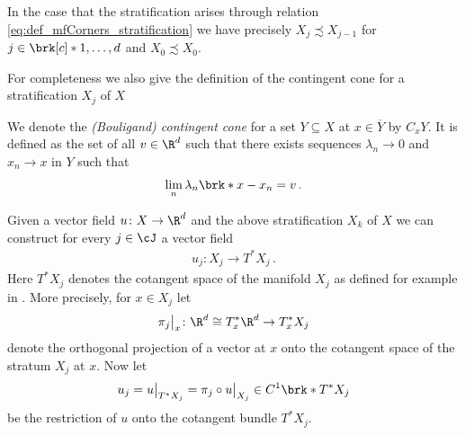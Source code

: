 In the case that the stratification arises through relation \eqref{eq:def_mfCorners_stratification}
we have precisely $X_{j}\precsim X_{j-1}$ for $j\in\brk[c]*{1,\dots,d}$ and $X_0\precsim X_0$.

For completeness we also give the definition of the contingent cone for a 
stratification $X_j$ of $X$
\begin{definition}
  We denote the \emph{(Bouligand) contingent cone} for a set $Y\subseteq X$ at $x\in\overline{Y}$ by $C_xY$.
  It is defined as the set of all $v\in\R^d$ such that there exists sequences $\lambda_n\to0$ and $x_n\to x$ in
  $Y$ such that
  $$\lim_n\lambda_n\brk*{x-x_n}=v\,.$$
\end{definition}

Given a vector field $u\colon X\to\R^d$ and the above stratification $X_k$ of $X$ we can construct for every
$j\in\cJ$ a vector field
\begin{align*}
  u_j\colon X_j\to T^*X_j\,.
\end{align*}
Here $T^*X_j$ denotes the cotangent space of the manifold $X_j$ as defined for example in \cite[Chapter 6]{Hirsch1994}.
More precisely, for $x\in X_j$ let
\begin{align}
  \pi_j\big\vert_x\colon\R^d\cong T_x^*\R^d\to T_x^*X_{j}\label{eq:def_projectionStratification}
\end{align}
denote the orthogonal projection of a vector at $x$ onto the cotangent space of the stratum $X_j$ at $x$.
Now let
\begin{align}
  u_j=u\big\vert_{T^*X_j}=\pi_j\circ u\big\vert_{X_j}\in C^1\brk*{T^*X_j}\label{eq:def_projectionUStratification}
\end{align}
be the restriction of $u$ onto the cotangent bundle $T^*X_j$.



